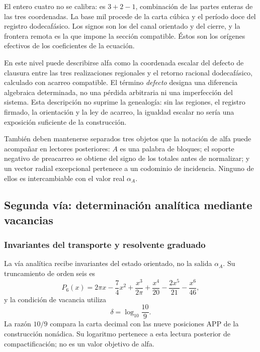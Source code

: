 El entero cuatro no se calibra: es
\(3+2-1\), combinación de las partes enteras de las tres coordenadas.
La base mil procede de la carta cúbica y el período doce del registro dodecafásico. Los
signos son los del canal orientado y del cierre, y la frontera remota es
la que impone la sección compatible. Éstos son los orígenes efectivos de
los coeficientes de la ecuación.

En este nivel puede describirse alfa como la coordenada escalar del
defecto de clausura entre las tres realizaciones regionales y el retorno
racional dodecafásico, calculado con acarreo compatible. El término
\emph{defecto} designa una diferencia algebraica determinada, no una
pérdida arbitraria ni una imperfección del sistema. Esta descripción no
suprime la genealogía: sin las regiones, el registro firmado, la
orientación y la ley de acarreo, la igualdad escalar no sería una
exposición suficiente de la construcción.

También deben mantenerse separados tres objetos que la notación de alfa
puede acompañar en lectores posteriores: \(A\) es una palabra de
bloques; el soporte negativo de preacarreo se obtiene del signo de los
totales antes de normalizar; y un vector radial excepcional pertenece a
un codominio de incidencia. Ninguno de ellos es intercambiable con el
valor real \(\alpha_A\).






\subsection{Segunda vía: determinación analítica mediante vacancias}
\subsubsection{Invariantes del transporte y resolvente graduado}
\label{subsec:alpha-via-b}

La vía analítica recibe invariantes del estado orientado, no la salida
\(\alpha_A\). Su truncamiento de orden seis es
\begin{equation}
 P_6(x)=2\pi x-\frac74x^2
 +\frac{x^3}{2\pi}
 +\frac{x^4}{20}-\frac{2x^5}{21}-\frac{x^6}{46},
 \label{eq:alpha-p6}
\end{equation}
y la condición de vacancia utiliza
\[
 \delta=\log_{10}\frac{10}{9}.
\]
La razón \(10/9\) compara la carta decimal con las nueve posiciones
APP de la construcción nonádica. Su logaritmo pertenece a esta lectura
posterior de compactificación; no es un valor objetivo de alfa.

